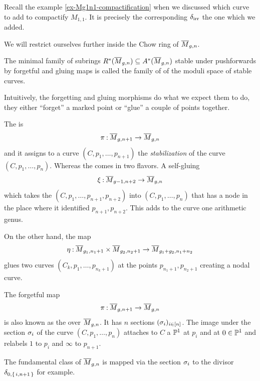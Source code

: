 \documentclass[12pt]{memoir}
\begin{document}
\begin{Rmk}
    Recall the example \ref{ex-Mg1n1-compactification} when we discussed which curve to add to compactify $M_{1,1}$. It is precisely the corresponding $\delta_{\text{irr}}$ the one which we added.
\end{Rmk}

We will restrict ourselves further inside the Chow ring of $\overline M_{g,n}$. 

\begin{Def}
The minimal family of subrings $R^\ast(\overline M_{g,n})\subseteq A^\ast(\overline M_{g,n})$ stable under pushforwards by forgetful and gluing maps is called the family of  of the moduli space of stable curves.
\end{Def}

Intuitively, the forgetting and gluing morphisms do what we expect them to do, they either ``forget'' a marked point or ``glue'' a couple of points together.  

\begin{Def}
    The  is 
    $$\pi\mathbin{:}\overline M_{g,n+1}\to\overline M_{g,n}$$ 
    and it assigns to a curve $(C,p_1,\dots,p_{n+1})$ the \emph{stabilization} of the curve $(C,p_1,\dots,p_n)$. Whereas the  comes in two flavors. A self-gluing 
    $$\xi\mathbin{:}\overline M_{g-1,n+2}\to\overline M_{g,n}$$
    which takes the $(C,p_1,\dots,p_{n+1},p_{n+2})$ into $(C,p_1,\dots,p_n)$ that has a node in the place where it identified $p_{n+1},p_{n+2}$. This adds to the curve one arithmetic genus.\par
    On the other hand, the map 
    $$\eta\mathbin{:}\overline M_{g_1,n_1+1}\times\overline M_{g_2,n_2+1}\to\overline M_{g_1+g_2,n_1+n_2}$$
    glues two curves $(C_k,p_1,\dots,p_{n_k+1})$ at the points $p_{n_1+1},p_{n_2+1}$ creating a nodal curve.
\end{Def}

\begin{Rmk}
    The forgetful map 
    $$\pi\mathbin{:}\overline M_{g,n+1}\to\overline M_{g,n}$$ 
    is also known as the  over $\overline M_{g,n}$. It has $n$ sections $(\sigma_i)_{i\in \left\lbrack n\right\rbrack}$. The image under the section $\sigma_i$ of the curve $(C,p_1,\dots, p_n)$ attaches to $C$ a $\mathbb{P}^1$ at $p_i$ and at $0\in\mathbb{P}^1$ and relabels $1$ to $p_i$ and $\infty$ to $p_{n+1}$.
\end{Rmk}

\begin{Ex}
    The fundamental class of $\overline M_{g,n}$ is mapped via the section $\sigma_i$ to the divisor $\delta_{0,\{\,i,n+1\,\}}$ for example.  
\end{Ex}
\end{document}
